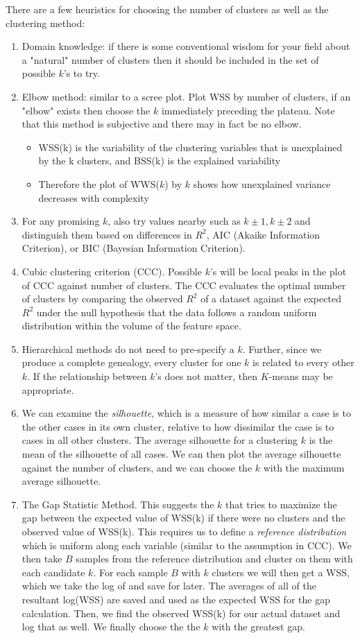There are a few heuristics for choosing the number of clusters as well as the clustering method:
\begin{enumerate}
    \setlength{\itemsep}{1em}
    \item Domain knowledge: if there is some conventional wisdom for your field about a "natural" number of clusters then it should be included in the set of possible $k$'s to try. 
    \item Elbow method: similar to a scree plot. Plot WSS by number of clusters, if an "elbow" exists then choose the $k$ immediately preceding the plateau. Note that this method is subjective and there may in fact be no elbow.
    \begin{itemize}[label=--]
        \item WSS(k) is the variability of the clustering variables that is unexplained by the k clusters, and BSS(k) is the explained variability
        \item Therefore the plot of WWS($k$) by $k$ shows how unexplained variance decreases with complexity
    \end{itemize}
    \item For any promising $k$, also try values nearby such as $k\pm 1, k\pm 2$ and distinguish them based on differences in $R^2$, AIC (Akaike Information Criterion), or BIC (Bayesian Information Criterion).
    \item Cubic clustering criterion (CCC). Possible $k$'s will be local peaks in the plot of CCC against number of clusters. The CCC evaluates the optimal number of clusters by comparing the observed $R^2$ of a dataset against the expected $R^2$ under the null hypothesis that the data follows a random uniform distribution within the volume of the feature space.
    \item Hierarchical methods do not need to pre-specify a $k$. Further, since we produce a complete genealogy, every cluster for one $k$ is related to every other $k$. If the relationship between $k$'s does not matter, then $K$-means may be appropriate.
    \item We can examine the \textit{silhouette}, which is a measure of how similar a case is to the other cases in its own cluster, relative to how dissimilar the case is to cases in all other clusters. The average silhouette for a clustering $k$ is the mean of the silhouette of all cases. We can then plot the average silhouette against the number of clusters, and we can choose the $k$ with the maximum average silhouette. 
    \item The Gap Statistic Method. This suggests the $k$ that tries to maximize the gap between the expected value of WSS(k) if there were no clusters and the observed value of WSS(k). This requires us to define a \textit{reference distribution} which is uniform along each variable (similar to the assumption in CCC). We then take $B$ samples from the reference distribution and cluster on them with each candidate $k$. For each sample $B$ with $k$ clusters we will then get a WSS, which we take the log of and save for later. The averages of all of the resultant log(WSS) are saved and used as the expected WSS for the gap calculation. Then, we find the observed WSS(k) for our actual dataset and log that as well. We finally choose the the $k$ with the greatest gap.

\end{enumerate}
